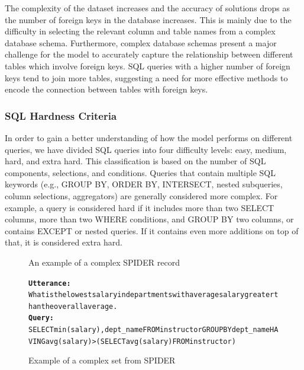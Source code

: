 The complexity of the dataset increases and the accuracy of solutions drops as the number of foreign keys in the database increases. This is mainly due to the difficulty in selecting the relevant column and table names from a complex database schema. Furthermore, complex database schemas present a major challenge for the model to accurately capture the relationship between different tables which involve foreign keys. SQL queries with a higher number of foreign keys tend to join more tables, suggesting a need for more effective methods to encode the connection between tables with foreign keys.

\subsubsection*{SQL Hardness Criteria}

In order to gain a better understanding of how the model performs on different queries, we have divided SQL queries into four difficulty levels: easy, medium, hard, and extra hard. This classification is based on the number of SQL components, selections, and conditions. Queries that contain multiple SQL keywords (e.g., GROUP BY, ORDER BY, INTERSECT, nested subqueries, column selections, aggregators) are generally considered more complex. For example, a query is considered hard if it includes more than two SELECT columns, more than two WHERE conditions, and GROUP BY two columns, or contains EXCEPT or nested queries. If it contains even more additions on top of that, it is considered extra hard.

\begin{figure}[H]
  \label{fig:Spider2}
  \begin{AIbox}{An example of a complex SPIDER record}
      \vspace{-5px}
      \parbox{1\textwidth}{\scriptsize
      \begin{alltt} \larger
          {\bf Utterance:} \\ 
          What is the lowest salary in departments with average salary greater than the overall average.
          \\
          {\bf Query:} \\
          SELECT min(salary) ,  dept\_name FROM instructor GROUP BY dept\_name HAVING avg(salary)  >  (SELECT avg(salary) FROM instructor)
      \end{alltt}
      }
      \vspace{-5px}
  \end{AIbox}
  \caption{Example of a complex set from SPIDER}
\end{figure}

